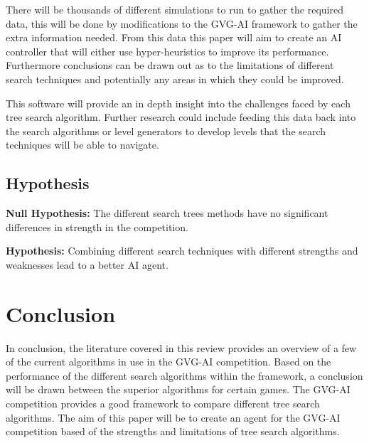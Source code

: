 \documentclass[journal]{IEEEtran}
\begin{document}
	There will be thousands of different simulations to run to gather the required data, this will be done by modifications to the GVG-AI framework to gather the extra information needed.
	From this data this paper will aim to create an AI controller that will either use hyper-heuristics to improve its performance. Furthermore conclusions can be drawn out as to the limitations of different search techniques and potentially any areas in which they could be improved.
	
	

	This software will provide an in depth insight into the challenges faced by each tree search algorithm.
	Further research could include feeding this data back into the search algorithms or level generators to develop levels that the search techniques will be able to navigate.

	
\subsection{Hypothesis}
	\textbf{Null Hypothesis:}
		The different search trees methods have no significant differences in strength in the competition.
		
	\textbf{Hypothesis:}
		Combining different search techniques with different strengths and weaknesses lead to a better AI agent.

\section{Conclusion}
	In conclusion, the literature covered in this review provides an overview of a few of the current algorithms in use in the GVG-AI competition.
	Based on the performance of the different search algorithms within the framework, a conclusion will be drawn between the superior algorithms for certain games.
	The GVG-AI competition provides a good framework to compare different tree search algorithms. 
	The aim of this paper will be to create an agent for the GVG-AI competition based of the strengths and limitations of tree search algorithms.












\end{document}
